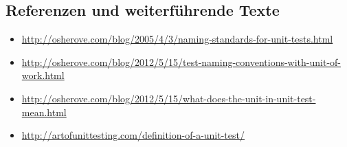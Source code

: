 \documentclass[11pt]{article}
\begin{document}
\subsection{Referenzen und weiterführende Texte}
\label{sec-1-3}
\begin{itemize}
\item \url{http://osherove.com/blog/2005/4/3/naming-standards-for-unit-tests.html}
\item \url{http://osherove.com/blog/2012/5/15/test-naming-conventions-with-unit-of-work.html}
\item \url{http://osherove.com/blog/2012/5/15/what-does-the-unit-in-unit-test-mean.html}
\item \url{http://artofunittesting.com/definition-of-a-unit-test/}
\end{itemize}
\end{document}
